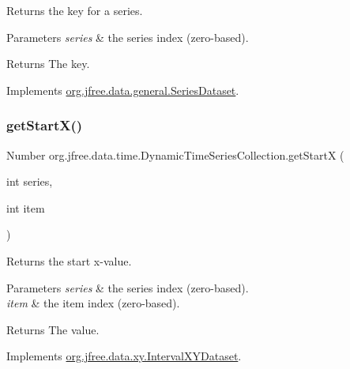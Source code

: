 Returns the key for a series.


\begin{DoxyParams}{Parameters}
{\em series} & the series index (zero-\/based).\\
\hline
\end{DoxyParams}
\begin{DoxyReturn}{Returns}
The key. 
\end{DoxyReturn}


Implements \mbox{\hyperlink{interfaceorg_1_1jfree_1_1data_1_1general_1_1_series_dataset_a60488892b2314a05a012999e26a74178}{org.\+jfree.\+data.\+general.\+Series\+Dataset}}.

\mbox{\label{classorg_1_1jfree_1_1data_1_1time_1_1_dynamic_time_series_collection_ac8f51b76cc0eede515c78e4cd22e7c53}} 
\subsubsection{\texorpdfstring{get\+Start\+X()}{getStartX()}}
{\footnotesize\ttfamily Number org.\+jfree.\+data.\+time.\+Dynamic\+Time\+Series\+Collection.\+get\+StartX (\begin{DoxyParamCaption}\item[{int}]{series,  }\item[{int}]{item }\end{DoxyParamCaption})}

Returns the start x-\/value.


\begin{DoxyParams}{Parameters}
{\em series} & the series index (zero-\/based). \\
\hline
{\em item} & the item index (zero-\/based).\\
\hline
\end{DoxyParams}
\begin{DoxyReturn}{Returns}
The value. 
\end{DoxyReturn}


Implements \mbox{\hyperlink{interfaceorg_1_1jfree_1_1data_1_1xy_1_1_interval_x_y_dataset_a7548ec7d60d72463313dc6f10aceee62}{org.\+jfree.\+data.\+xy.\+Interval\+X\+Y\+Dataset}}.

